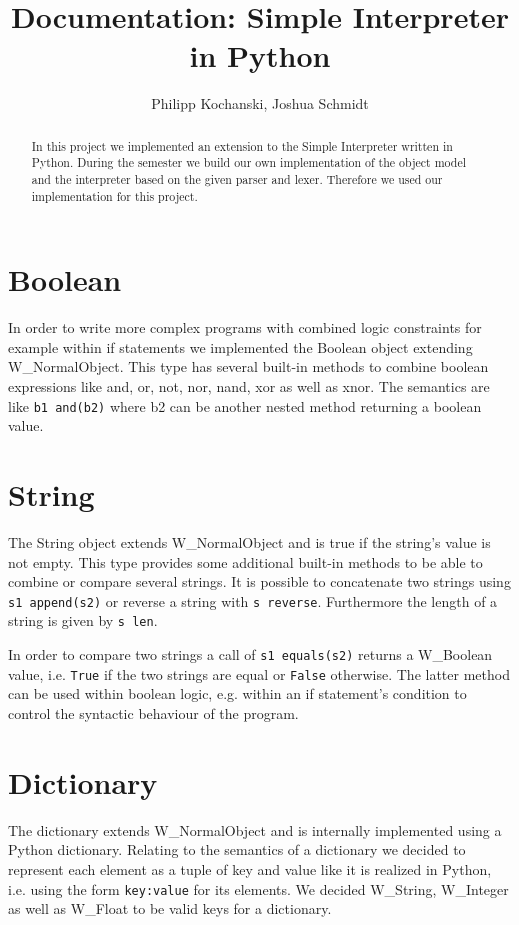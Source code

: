 \documentclass{article}
\begin{document}
\title{Documentation: Simple Interpreter in Python}
\author{Philipp Kochanski, Joshua Schmidt}

\maketitle

\begin{abstract}
In this project we implemented an extension to the Simple Interpreter written in Python. During the semester we build our own implementation of the object model and the interpreter based on the given parser and lexer. Therefore we used our implementation for this project.
\end{abstract}

\section{Boolean}
In order to write more complex programs with combined logic constraints for example within if statements we implemented the Boolean object extending W\_NormalObject.
This type has several built-in methods to combine boolean expressions like and, or, not, nor, nand, xor as well as xnor.
The semantics are like \texttt{b1 and(b2)} where b2 can be another nested method returning a boolean value.


\section{String}
The String object extends W\_NormalObject and is true if the string's value is not empty.
This type provides some additional built-in methods to be able to combine or compare several strings. 
It is possible to concatenate two strings using \texttt{s1 append(s2)} or reverse a string with \texttt{s reverse}. Furthermore the length of a string is given by \texttt{s len}. 

In order to compare two strings a call of \texttt{s1 equals(s2)} returns a W\_Boolean value, i.e. \texttt{True} if the two strings are equal or \texttt{False} otherwise.
The latter method can be used within boolean logic, e.g. within an if statement's condition to control the syntactic behaviour of the program.

\section{Dictionary}
\label{dicts}
The dictionary extends W\_NormalObject and is internally implemented using a Python dictionary.
Relating to the semantics of a dictionary we decided to represent each element as a tuple of key and value like it is realized in Python, i.e. using the form \texttt{key:value} for its elements.
We decided W\_String, W\_Integer as well as W\_Float to be valid keys for a dictionary.
\end{document}
